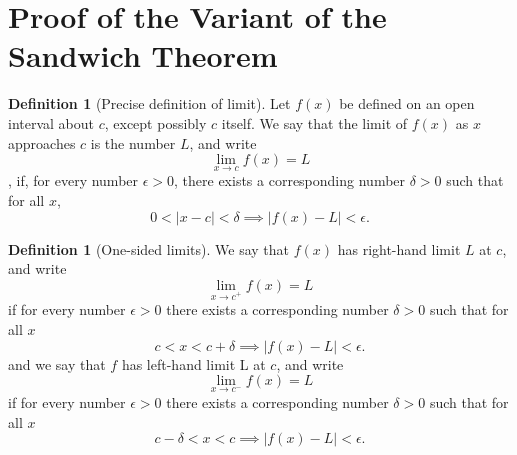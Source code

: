 \documentclass[a4paper,twoside,12pt]{article}
\theoremstyle{plain}
\theoremstyle{definition}
\newtheorem{definition}[theorem]{Definition}
\begin{document}
 \section{Proof of the Variant of the Sandwich Theorem}

 \begin{definition}[Precise definition of limit] \cite{thomas}
     Let $f(x)$ be defined on an open interval about $c$, except possibly $c$ itself. We say that the limit of $f(x)$ as $x$ approaches $c$ is the number $L$, and write $$\lim_{x \to c} f(x)=L$$,
     if, for every number $\epsilon > 0$, there exists a corresponding number $\delta >0$ such that for all $x$, \[0<|x-c|< \delta \implies |f(x)-L|<\epsilon .\]
 \end{definition}

 \begin{definition}[One-sided limits] \cite{thomas}
 We say that $f(x)$ has right-hand limit $L$ at $c$, and write $$\lim_{x \to c^+} f(x) = L$$
 if for every number $\epsilon >0$ there exists a corresponding number $\delta >0$ such that for all $x$ $$c<x<c+\delta \implies |f(x) - L| < \epsilon .$$ and we say that $f$ has left-hand limit L at $c$, and write $$\lim_{x \to c^-} f(x) = L$$
 if for every number $\epsilon >0$ there exists a corresponding number $\delta >0$ such that for all $x$ $$c - \delta<x<c \implies |f(x) - L| < \epsilon .$$
 \end{definition}
\vspace{5mm}
\end{document}
